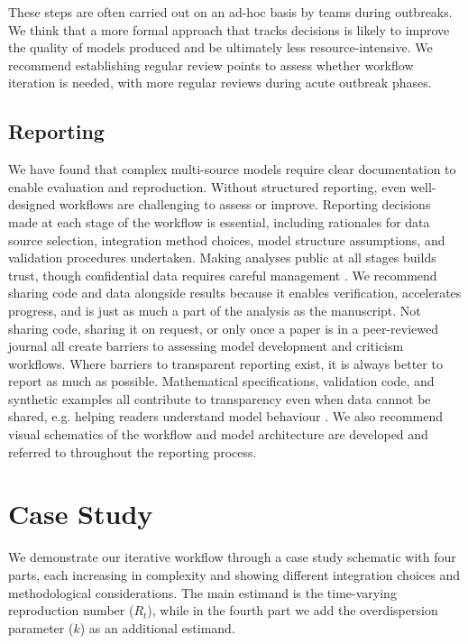 \documentclass{article}
\begin{document}
These steps are often carried out on an ad-hoc basis by teams during outbreaks.
We think that a more formal approach that tracks decisions is likely to improve the quality of models produced and be ultimately less resource-intensive.
We recommend establishing regular review points to assess whether workflow iteration is needed, with more regular reviews during acute outbreak phases.

\subsection{Reporting} \label{sec:reporting}
We have found that complex multi-source models require clear documentation to enable evaluation and reproduction.
Without structured reporting, even well-designed workflows are challenging to assess or improve.
Reporting decisions made at each stage of the workflow is essential, including rationales for data source selection, integration method choices, model structure assumptions, and validation procedures undertaken.
Making analyses public at all stages builds trust, though confidential data requires careful management \citep{Abbott2021-delta, Abbott2022-prevalence}. 
We recommend sharing code and data alongside results because it enables verification, accelerates progress, and is just as much a part of the analysis as the manuscript.
Not sharing code, sharing it on request, or only once a paper is in a peer-reviewed journal all create barriers to assessing model development and criticism workflows.
Where barriers to transparent reporting exist, it is always better to report as much as possible.
Mathematical specifications, validation code, and synthetic examples all contribute to transparency even when data cannot be shared, e.g. helping readers understand model behaviour \citep{Mellor2025-norovirus}.
We also recommend visual schematics of the workflow and model architecture are developed and referred to throughout the reporting process.

\section{Case Study}
\label{sec:casestudies}

We demonstrate our iterative workflow through a case study schematic with four parts, each increasing in complexity and showing different integration choices and methodological considerations. The main estimand is the time-varying reproduction number ($R_t$), while in the fourth part we add the overdispersion parameter ($k$) as an additional estimand.
\end{document}
